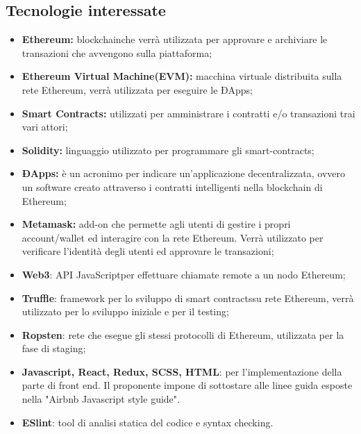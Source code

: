 \subsection{Tecnologie interessate}
\begin{itemize}
  
	\item \textbf{Ethereum\glo:} blockchain\glosp che verrà utilizzata per approvare e archiviare le transazioni che avvengono sulla piattaforma;
	\item \textbf{Ethereum Virtual Machine\glosp (EVM):} macchina virtuale distribuita sulla rete Ethereum\glo, verrà utilizzata per eseguire le ÐApps\glo; 
	\item \textbf{Smart Contracts\glo:} utilizzati per amministrare i contratti e/o transazioni trai vari attori;
	\item \textbf{Solidity:} linguaggio utilizzato per programmare gli smart-contracts;
	\item \textbf{ÐApps\glo:} è un acronimo per indicare un'applicazione decentralizzata, ovvero un software creato attraverso i contratti intelligenti nella blockchain di Ethereum\glo;
	\item \textbf{Metamask\glo:} add-on che permette agli utenti di gestire i propri account/wallet ed interagire con la rete Ethereum\glo. Verrà utilizzato per verificare l'identità degli utenti ed approvare le transazioni; 
	\item \textbf{Web3}: API JavaScript\glosp per effettuare chiamate remote a un nodo Ethereum\glo;
	\item \textbf{Truffle}: framework per lo sviluppo di smart contracts\glosp su rete Ethereum\glo, verrà utilizzato per lo sviluppo iniziale e per il testing;
	\item \textbf {Ropsten}: rete che esegue gli stessi protocolli di Ethereum, utilizzata per la fase di staging;
	\item \textbf{Javascript, React\glo, Redux\glo, SCSS\glo, HTML}: per l'implementazione della parte di front end. Il proponente impone di sottostare alle linee guida esposte nella "Airbnb Javascript style guide".
	\item \textbf{ESlint\glo}: tool di analisi statica del codice e syntax checking.

\end{itemize}

